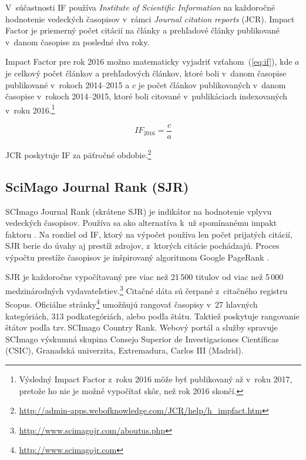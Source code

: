 V~súčastnosti IF používa \emph{Institute of Scientific Information} na
každoročné hodnotenie vedeckých časopisov v~rámci \emph{Journal citation
  reports} (JCR).  Impact Factor je priemerný počet citácií na články a
prehľadové články publikované v~danom časopise za posledné dva roky.

Impact Factor pre rok 2016 možno matematicky vyjadriť vzťahom~(\ref{eq:if}), kde
$a$ je celkový počet článkov a prehľadových článkov, ktoré boli v~danom časopise
publikované v~rokoch 2014--2015 a $c$ je počet článkov publikovaných v~danom
časopise v~rokoch 2014--2015, ktoré boli citované v~publikáciach indexovaných
v~roku 2016.\footnote{Výsledný Impact Factor z~roku 2016 môže byť publikovaný až
  v~roku 2017, pretože ho nie je možné vypočítať skôr, než rok 2016 skončí.}

\begin{equation}
\label{eq:if}
\mathit{IF}_{2016} = \frac{c}{a}
\end{equation}

\noindent JCR poskytuje IF za päťročné obdobie.\footnote{\url{http://admin-apps.webofknowledge.com/JCR/help/h_impfact.htm}}

\subsection{SciMago Journal Rank (SJR)}
\label{sec:sjr}

SCImago Journal Rank (skrátene SJR) je indikátor na hodnotenie vplyvu vedeckých
časopisov.  Používa sa ako alternatíva k~už spomínanému impakt faktoru
\citep{Falagas2008}.  Na rozdiel od IF, ktorý na výpočet používa len počet
prijatých citácií, SJR berie do úvahy aj prestíž zdrojov, z~ktorých citácie
pochádzajú.  Proces výpočtu prestíže časopisov \citep{GuerreroBote2012} je
inšpirovaný algoritmom Google PageRank\texttrademark{} \citep{Page1999}.

SJR je každoročne vypočítavaný pre viac než 21\,500 titulov od viac než 5\,000
medzinárodných
vydavateľstiev.\footnote{\url{http://www.scimagojr.com/aboutus.php}} Citačné
dáta sú čerpané z~citačného registru Scopus\textsuperscript{\textregistered}.
Oficiálne stránky\footnote{\url{http://www.scimagojr.com}} umožňujú rangovať
časopisy v~27 hlavných kategóriách, 313 podkategóriách, alebo podľa štátu.
Taktiež poskytuje rangovanie štátov podľa tzv.\,SCImago Country Rank.  Webový
portál a služby spravuje SCImago výskumná skupina Consejo Superior de
Investigaciones Científicas (CSIC), Granadská univerzita, Extremadura, Carlos
III (Madrid).


